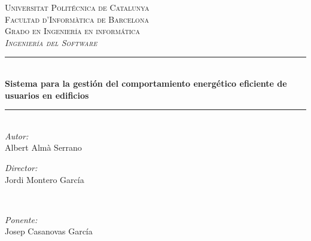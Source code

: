 \begin{titlepage}

\newcommand{\HRule}{\rule{\linewidth}{0.5mm}} %

\center %
 

\textsc{\LARGE Universitat Politécnica de Catalunya}\\[0.5cm]
\textsc{\Large Facultad d'Informàtica de Barcelona}\\[0.5cm]
\textsc{\large Grado en Ingeniería en informática}\\[0.5cm]
\textsc{\large \emph {Ingeniería del Software}}\\[0.5cm] 


\HRule \\[0.4cm]
{ \huge \bfseries Sistema para la gestión del comportamiento energético eficiente de usuarios en edificios}\\[0.4cm] %
\HRule \\[1.5cm]
 

\Large \emph{Autor:}\\
Albert Almà Serrano\\[3cm] %

\begin{minipage}{0.4\textwidth}
\begin{flushleft} \large
\emph{Director:}\\
Jordi Montero García
\end{flushleft}
\end{minipage}
~
\begin{minipage}{0.4\textwidth}
\begin{flushright} \large
\emph{Ponente:} \\
Josep Casanovas García 
\end{flushright}
\end{minipage}\\[3cm]


\end{titlepage}
